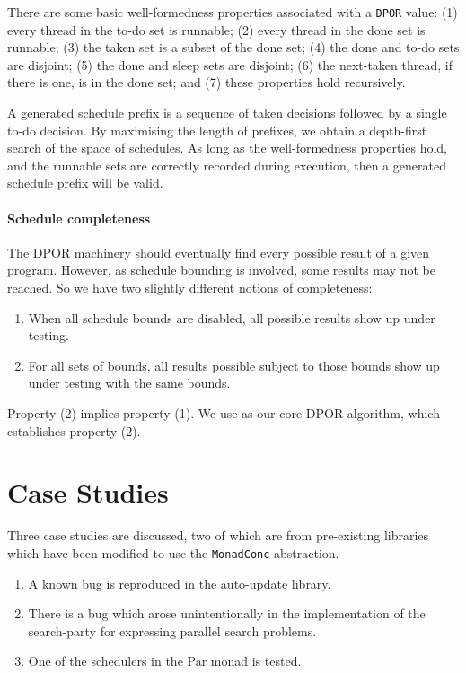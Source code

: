 There are some basic well-formedness properties associated with a
\verb|DPOR| value: (1) every thread in the to-do set is runnable; (2)
every thread in the done set is runnable; (3) the taken set is a
subset of the done set; (4) the done and to-do sets are disjoint; (5)
the done and sleep sets are disjoint; (6) the next-taken thread, if
there is one, is in the done set; and (7) these properties hold
recursively.

A generated schedule prefix is a sequence of taken decisions followed
by a single to-do decision.  By maximising the length of prefixes, we
obtain a depth-first search of the space of schedules.  As long as the
well-formedness properties hold, and the runnable sets are correctly
recorded during execution, then a generated schedule prefix will be
valid.

\paragraph{Schedule completeness}
The DPOR machinery should eventually find every possible result of a
given program.  However, as schedule bounding is involved, some
results may not be reached.  So we have two slightly different notions
of completeness:

\begin{enumerate}
\item When all schedule bounds are disabled, all possible results show
  up under testing.
\item For all sets of bounds, all results possible subject to those
  bounds show up under testing with the same bounds.
\end{enumerate}

Property (2) implies property (1).  We use \cite{coons2013} as our
core DPOR algorithm, which establishes property (2).

\section{Case Studies}
\label{sec:dejafu-casestudies}

Three case studies are discussed, two of which are from pre-existing
libraries which have been modified to use the \verb|MonadConc|
abstraction.

\begin{enumerate}
\item A known bug is reproduced in the auto-update\cite{auto_update}
  library.
\item There is a bug which arose unintentionally in the implementation
  of the search-party\cite{search_party} for expressing parallel
  search problems.
\item One of the schedulers in the Par monad\cite{marlow2011} is
  tested.
\end{enumerate}

